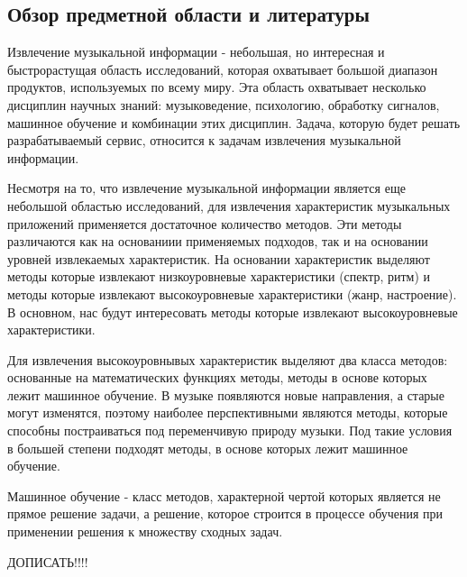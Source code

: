 \subsection{Обзор предметной области и литературы}
\label{sec:analysis:literature}

Извлечение музыкальной информации - небольшая, но интересная и быстрорастущая область исследований, которая охватывает большой диапазон продуктов, используемых по всему миру. Эта область охватывает несколько дисциплин научных знаний: музыковедение, психологию, обработку сигналов, машинное обучение и комбинации этих дисциплин. Задача, которую будет решать разрабатываемый сервис, относится к задачам извлечения музыкальной информации.

Несмотря на то, что извлечение музыкальной информации является еще небольшой областью исследований, для извлечения характеристик музыкальных приложений применяется достаточное количество методов. Эти методы различаются как на основаниии применяемых подходов, так и на основании уровней извлекаемых характеристик. На основании характеристик выделяют методы которые извлекают низкоуровневые характеристики (спектр, ритм) и методы которые извлекают высокоуровневые характеристики (жанр, настроение). В основном, нас будут интересовать методы которые извлекают высокоуровневые характеристики.

Для извлечения высокоуровнывых характеристик выделяют два класса методов: основанные на математических функциях методы, методы в основе которых лежит машинное обучение. В музыке появляются новые направления, а старые могут изменятся, поэтому наиболее перспективными являются методы, которые способны постраиваться под переменчивую природу музыки. Под такие условия в большей степени подходят методы, в основе которых лежит машинное обучение.

Машинное обучение - класс методов, характерной чертой которых является не прямое решение задачи, а решение, которое строится в процессе обучения при применении решения к множеству сходных задач.


ДОПИСАТЬ!!!!
